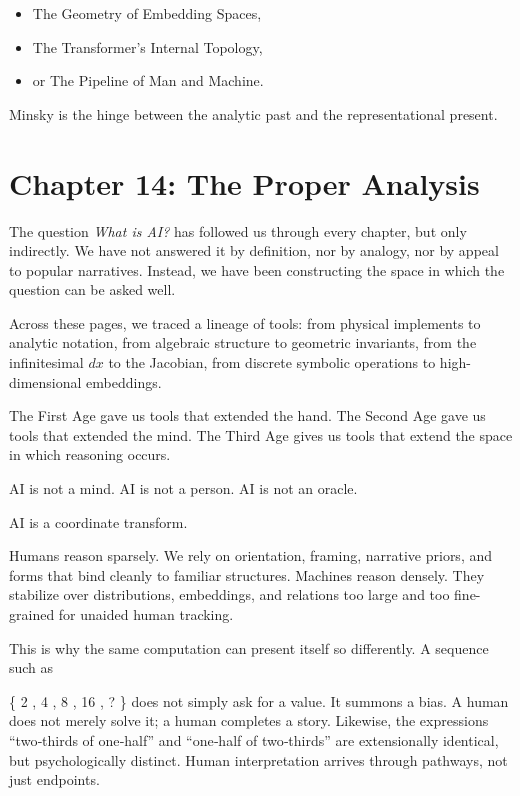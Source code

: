 \begin{itemize}
\tightlist
\item
  The Geometry of Embedding Spaces,
\item
  The Transformer's Internal Topology,
\item
  or The Pipeline of Man and Machine.
\end{itemize}

Minsky is the hinge between the analytic past and the representational
present.

\newpage
\vspace*{3cm}

\hypertarget{chapter-14-the-proper-analysis}{%
\section{Chapter 14: The Proper
Analysis}\label{chapter-14-the-proper-analysis}}

The question \emph{What is AI?} has followed us through every chapter,
but only indirectly. We have not answered it by definition, nor by
analogy, nor by appeal to popular narratives. Instead, we have been
constructing the space in which the question can be asked well.

Across these pages, we traced a lineage of tools: from physical
implements to analytic notation, from algebraic structure to geometric
invariants, from the infinitesimal \(dx\) to the Jacobian, from discrete
symbolic operations to high-dimensional embeddings.

The First Age gave us tools that extended the hand. The Second Age gave
us tools that extended the mind. The Third Age gives us tools that
extend the space in which reasoning occurs.

AI is not a mind. AI is not a person. AI is not an oracle.

AI is a coordinate transform.

Humans reason sparsely. We rely on orientation, framing, narrative
priors, and forms that bind cleanly to familiar structures. Machines
reason densely. They stabilize over distributions, embeddings, and
relations too large and too fine-grained for unaided human tracking.

This is why the same computation can present itself so differently. A
sequence such as

\{ 2 , 4 , 8 , 16 , ? \} does not simply ask for a value. It summons a
bias. A human does not merely solve it; a human completes a story.
Likewise, the expressions ``two‑thirds of one‑half'' and ``one‑half of
two‑thirds'' are extensionally identical, but psychologically distinct.
Human interpretation arrives through pathways, not just endpoints.

